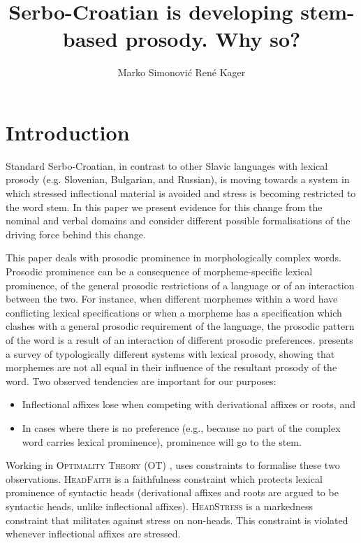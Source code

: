 \documentclass[output=paper,modfonts,nonflat
]{langsci/langscibook}
\title{Serbo-Croatian is developing stem-based prosody. Why so?}
\author{%
 Marko Simonović\affiliation{University of Nova Gorica}\orcid{0000-0002-9651-6399}\lastand 
 René Kager\affiliation{Utrecht University}\orcid{0000-0002-5811-839X}}
\begin{document}
\maketitle

\section{Introduction} \label{sec:kager:1}
\sloppy Standard Serbo-Croatian, in contrast to other Slavic languages with lexical prosody (e.g. Slovenian, Bulgarian, and Russian), is moving towards a system in which stressed inflectional material is avoided and stress is becoming restricted to the word stem. In this paper we present evidence for this change from the nominal and verbal domains and consider different possible formalisations of the driving force behind this change.

This paper deals with prosodic prominence in morphologically complex words. Prosodic prominence can be a consequence of morpheme-specific lexical prominence, of the general prosodic restrictions of a language or of an interaction between the two. For instance, when different morphemes within a word have conflicting lexical specifications or when a morpheme has a specification which clashes with a general prosodic requirement of the language, the prosodic pattern of the word is a result of an interaction of different prosodic preferences. \citet{Revithiadou1999} presents a survey of typologically different systems with lexical prosody, showing that morphemes are not all equal in their influence of the resultant prosody of the word. Two observed tendencies are important for our purposes:

\begin{itemize}
\item Inflectional affixes lose when competing with derivational affixes or roots, and
\item In cases where there is no preference (e.g., because no part of the complex word carries lexical prominence), prominence will go to the stem.
\end{itemize}

\noindent Working in \textsc{Optimality Theory} (OT) \citep[]{Prince1993}, \citet{Revithiadou1999} uses constraints to formalise these two observations. \textsc{HeadFaith} is a faithfulness constraint which protects lexical prominence of syntactic heads (derivational affixes and roots are argued to be syntactic heads, unlike inflectional affixes). \textsc{HeadStress} is a markedness constraint that militates against stress on non-heads. This constraint is violated whenever inflectional affixes are stressed.
\end{document}
